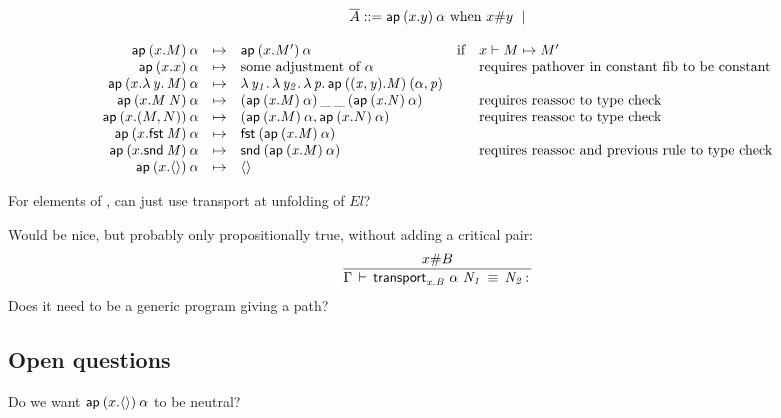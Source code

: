 \begin{small}
\[
\begin{array}{l}
\overline{A} ::= \mathsf{ap} \: {(x.y)} \: {\alpha} \text{ when $x \# y$ } \mid \\
\end{array}
\]
\end{small}

\begin{small}
\[
\begin{array}{rclll}
\mathsf{ap} \: {(x.M)} \: {\alpha} & \mapsto & \mathsf{ap} \: {(x.M')} \: {\alpha} & \text{if} & x \vdash M \mapsto M'\\ 
\mathsf{ap} \: {(x.x)} \: {\alpha} & \mapsto & \text{some adjustment of $\alpha$} & & \text{requires pathover in constant fib to be constant}\\ 
\mathsf{ap} \: {(x.\mathit{\lambda\,y.\,M})} \: {\alpha} & \mapsto & \mathit{\lambda\,y_1.\,\mathit{\lambda\,y_2.\,\mathit{\lambda\,p.\,\mathsf{ap} \: {((x,y).M)} \: {(\alpha,p)}}}}\\
\mathsf{ap} \: {(x.\mathit{M \: N})} \: {\alpha} & \mapsto & \mathit{(\mathsf{ap} \: {(x.M)} \: {\alpha}) \: \_ \: \_ \: (\mathsf{ap} \: {(x.N)} \: {\alpha})} & &\text{requires reassoc to type check}\\ 
\mathsf{ap} \: {(x.(M,N))} \: {\alpha} & \mapsto & (\mathsf{ap} \: {(x.M)} \: {\alpha}, \mathsf{ap} \: {(x.N)} \: {\alpha}) & & \text{requires reassoc to type check}\\ 
\mathsf{ap} \: {(x.\mathit{\mathsf{fst} \: M})} \: {\alpha} & \mapsto & \mathit{\mathsf{fst} \: (\mathsf{ap} \: {(x.M)} \: {\alpha})} & & \\ 
\mathsf{ap} \: {(x.\mathit{\mathsf{snd} \: M})} \: {\alpha} & \mapsto & \mathit{\mathsf{snd} \: (\mathsf{ap} \: {(x.M)} \: {\alpha})} & & \text{requires reassoc and previous rule to type check}\\ 
\mathsf{ap} \: {(x.\mathsf{\langle\rangle})} \: {\alpha} & \mapsto & \mathsf{\langle\rangle} & \\ 
\end{array}
\]
\end{small}

For elements of \set, can just use transport at unfolding of $El$?  

Would be nice, but probably only propositionally true, without adding a
critical pair:
\[
\infer{\deqtm{\Gamma}{\transport{x.B}{\alpha}{N_1}}{N_2}{}}
      {x \# B}
\]
Does it need to be a generic program giving a path?

\subsection{Open questions}

Do we want $\mathsf{ap} \: {(x.\mathsf{\langle\rangle})} \: {\alpha}$ to be neutral?


